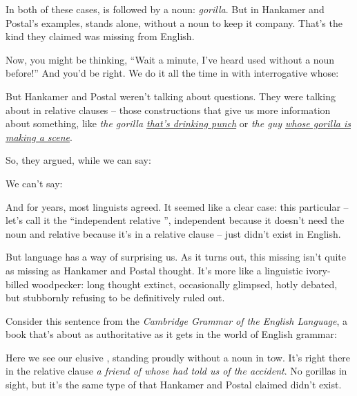 In both of these cases,  is followed by a noun: \textit{gorilla}. But in Hankamer and Postal's examples,  stands alone, without a noun to keep it company. That's the kind they claimed was missing from English.

Now, you might be thinking, \enquote{Wait a minute, I've heard  used without a noun before!} And you'd be right. We do it all the time in with interrogative whose:

\z

But Hankamer and Postal weren't talking about questions. They were talking about  in relative clauses -- those constructions that give us more information about something, like \textit{the gorilla \uline{that's drinking punch}} or \textit{the guy \uline{whose gorilla is making a scene}}.

So, they argued, while we can say:

\z

We can't say:

\z

And for years, most linguists agreed. It seemed like a clear case: this particular  -- let's call it the \enquote{independent relative }, independent because it doesn't need the noun and relative because it's in a relative clause -- just didn't exist in English.

But language has a way of surprising us. As it turns out, this missing  isn't quite as missing as Hankamer and Postal thought. It's more like a linguistic ivory-billed woodpecker: long thought extinct, occasionally glimpsed, hotly debated, but stubbornly refusing to be definitively ruled out.

Consider this sentence from the \textit{Cambridge Grammar of the English Language}, a book that's about as authoritative as it gets in the world of English grammar:

\z

Here we see our elusive , standing proudly without a noun in tow. It's right there in the relative clause \textit{a friend of whose had told us of the accident}. No gorillas in sight, but it's the same type of  that Hankamer and Postal claimed didn't exist.


